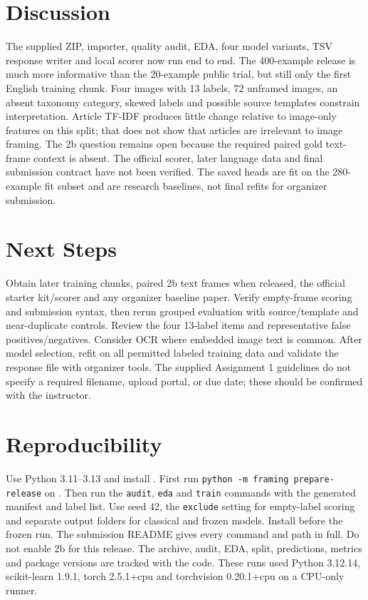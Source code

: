 \documentclass[11pt]{article}
\begin{document}
\section{Discussion}\label{sec:discussion}
The supplied ZIP, importer, quality audit, EDA, four model variants, TSV response writer and local scorer now run end to end. The 400-example release is much more informative than the 20-example public trial, but still only the first English training chunk. Four images with 13 labels, 72 unframed images, an absent taxonomy category, skewed labels and possible source templates constrain interpretation. Article TF-IDF produces little change relative to image-only features on this split; that does not show that articles are irrelevant to image framing. The 2b question remains open because the required paired gold text-frame context is absent. The official scorer, later language data and final submission contract have not been verified. The saved heads are fit on the 280-example fit subset and are research baselines, not final refits for organizer submission.

\section{Next Steps}\label{sec:next}
Obtain later training chunks, paired 2b text frames when released, the official starter kit/scorer and any organizer baseline paper. Verify empty-frame scoring and submission syntax, then rerun grouped evaluation with source/template and near-duplicate controls. Review the four 13-label items and representative false positives/negatives. Consider OCR where embedded image text is common. After model selection, refit on all permitted labeled training data and validate the response file with organizer tools. The supplied Assignment 1 guidelines do not specify a required filename, upload portal, or due date; these should be confirmed with the instructor.

\section*{Reproducibility}
Use Python 3.11--3.13 and install . First run \texttt{python -m framing prepare-release} on . Then run the \texttt{audit}, \texttt{eda} and \texttt{train} commands with the generated manifest and label list. Use seed 42, the \texttt{exclude} setting for empty-label scoring and separate output folders for classical and frozen models. Install  before the frozen run. The submission README gives every command and path in full. Do not enable 2b for this release. The archive, audit, EDA, split, predictions, metrics and package versions are tracked with the code. These runs used Python 3.12.14, scikit-learn 1.9.1, torch 2.5.1+cpu and torchvision 0.20.1+cpu on a CPU-only runner.



\end{document}
